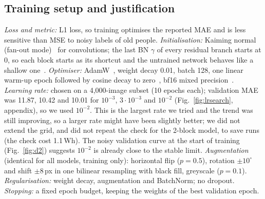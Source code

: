 \documentclass[conference,a4paper]{IEEEtran}
\begin{document}
\subsection{Training setup and justification}
\label{sec:owntrain}
\emph{Loss and metric:} L1 loss, so training optimises the reported MAE and is less sensitive than MSE to noisy labels of old people. \emph{Initialisation:} Kaiming normal (fan-out mode)~\cite{he2015delving} for convolutions; the last BN $\gamma$ of every residual branch starts at 0, so each block starts as its shortcut and the untrained network behaves like a shallow one~\cite{goyal2017accurate}. \emph{Optimiser:} AdamW~\cite{loshchilov2019adamw}, weight decay 0.01, batch 128, one linear warm-up epoch followed by cosine decay to zero~\cite{loshchilov2017sgdr}, bf16 mixed precision~\cite{micikevicius2018mixed}. \emph{Learning rate:} chosen on a 4{,}000-image subset (10 epochs each); validation MAE was 11.87, 10.42 and 10.01 for $10^{-3}$, $3\cdot10^{-3}$ and $10^{-2}$ (Fig.~\ref{fig:lrsearch}, appendix), so we used $10^{-2}$. This is the largest rate we tried and the trend was still improving, so a larger rate might have been slightly better; we did not extend the grid, and did not repeat the check for the 2-block model, to save runs (the check cost 1.1\,Wh). The noisy validation curve at the start of training (Fig.~\ref{fig:d2}) suggests $10^{-2}$ is already close to the stable limit. \emph{Augmentation} (identical for all models, training only): horizontal flip ($p=0.5$), rotation $\pm10^{\circ}$ and shift $\pm8$\,px in one bilinear resampling with black fill, greyscale ($p=0.1$). \emph{Regularisation:} weight decay, augmentation and BatchNorm; no dropout. \emph{Stopping:} a fixed epoch budget, keeping the weights of the best validation epoch.
\end{document}
